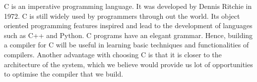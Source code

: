 C is an imperative programming language. It was developed by Dennis 
Ritchie in 1972. C is still widely used by programmers through out the 
world. Its object oriented programming features inspired and lead to 
the development of languages such as C++ and Python. C programs have an 
elegant grammar. Hence, building a compiler for C will be useful in 
learning basic techniques and functionalities of compilers. Another 
advantage with choosing C is that it is closer to the architecture
of the system, which we believe would provide us lot of opportunities
to optimise the compiler that we build.